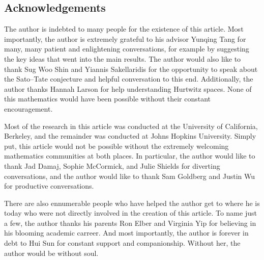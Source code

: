 \documentclass[openany]{book}
\begin{document}
\subsection{Acknowledgements}
The author is indebted to many people for the existence of this article. Most importantly, the author is extremely grateful to his advisor Yunqing Tang for many, many patient and enlightening conversations, for example by suggesting the key ideas that went into the main results. The author would also like to thank Sug Woo Shin and Yiannis Sakellaridis for the opportunity to speak about the Sato--Tate conjecture and helpful conversation to this end. Additionally, the author thanks Hannah Larson for help understanding Hurtwitz spaces. None of this mathematics would have been possible without their constant encouragement.

Most of the research in this article was conducted at the University of California, Berkeley, and the remainder was conducted at Johns Hopkins University. Simply put, this article would not be possible without the extremely welcoming mathematics communities at both places. In particular, the author would like to thank Jad Damaj, Sophie McCormick, and Julie Shields for diverting conversations, and the author would like to thank Sam Goldberg and Justin Wu for productive conversations.

There are also ennumerable people who have helped the author get to where he is today who were not directly involved in the creation of this article. To name just a few, the author thanks his parents Ron Elber and Virginia Yip for believing in his blooming academic carreer. And most importantly, the author is forever in debt to Hui Sun for constant support and companionship. Without her, the author would be without soul.



% 








\nirprintbib
\nirprintindex
\end{document}

